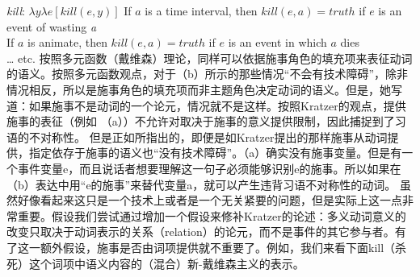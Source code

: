 \eal
\ex \emph{kill}: $\lambda y\lambda e[kill(e, y)]$ 
\ex If $a$ is a time interval, then $kill(e, a) = truth$ if $e$ is an event of wasting \emph{a} \\
If $a$ is animate, then $kill(e, a) = truth$ if $e$ is an event in which $a$ dies \\
\ldots{} etc.
\zl
按照多元函数（戴维森）理论，同样可以依据施事角色的填充项来表征动词的语义。按照多元函数观点，对于（b）所示的那些情况“不会有技术障碍”\citep[]{Kratzer96a}，除非情况相反，所以是施事角色的填充项而非主题角色决定动词的语义。但是，她写道：如果施事不是动词的一个论元，情况就不是这样。按照Kratzer的观点，提供施事的表征（例如 （a））不允许对取决于施事的意义提供限制，因此捕捉到了习语的不对称性。
    但是正如\citet{Wechsler2005a}所指出的，即便是如Kratzer提出的那样施事从动词提供，指定依存于施事的语义也“没有技术障碍”。（a）确实没有施事变量。但是有一个事件变量e，而且说话者想要理解这一句子必须能够识别e的施事。所以如果在（b）表达中用“e的施事”来替代变量a，就可以产生违背习语不对称性的动词。
虽然好像看起来这只是一个技术上或者是一个无关紧要的问题，但是实际上这一点非常重要。假设我们尝试通过增加一个假设来修补Kratzer的论述：多义动词意义的改变只取决于动词表示的关系（relation）的论元，而不是事件的其它参与者。有了这一额外假设，施事是否由词项提供就不重要了。例如，我们来看下面kill（杀死）这个词项中语义内容的（混合）新-戴维森主义的表示。
